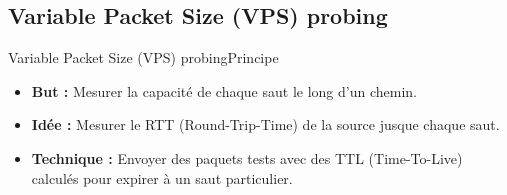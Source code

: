 \documentclass[compress]{beamer}
\begin{document}
\subsection{Variable Packet Size (VPS) probing}
\begin{frame}{Variable Packet Size (VPS) probing}{Principe}
\begin{itemize}
\item \textbf{But :}  Mesurer la {\color{red}capacité} de chaque saut le long d'un chemin.
\item \textbf{Idée :}  Mesurer le {\color{red}RTT} (Round-Trip-Time) de la source jusque chaque saut.
\item \textbf{Technique :} Envoyer des paquets tests avec des {\color{red}TTL} (Time-To-Live) calculés pour expirer à un saut particulier. 
\end{itemize}

%
%	
%	
%

\end{frame}

\end{document}
